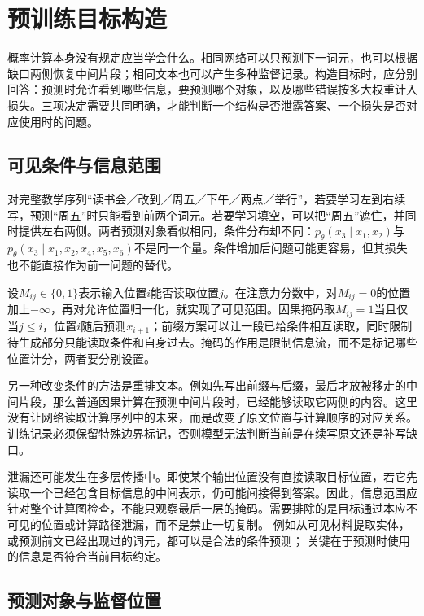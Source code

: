 \section{预训练目标构造}
\label{sec:nlp-llm-objectives}

概率计算本身没有规定应当学会什么。相同网络可以只预测下一词元，也可以根据缺口两侧恢复中间片段；相同文本也可以产生多种监督记录。构造目标时，应分别回答：预测时允许看到哪些信息，要预测哪个对象，以及哪些错误按多大权重计入损失。三项决定需要共同明确，才能判断一个结构是否泄露答案、一个损失是否对应使用时的问题。

\subsection{可见条件与信息范围}
\label{sec:nlp-llm-objective-visibility}

对完整教学序列“读书会／改到／周五／下午／两点／举行”，若要学习左到右续写，预测“周五”时只能看到前两个词元。若要学习填空，可以把“周五”遮住，并同时提供左右两侧。两者预测对象看似相同，条件分布却不同：$p_\theta(x_3\mid x_1,x_2)$与$p_\theta(x_3\mid x_1,x_2,x_4,x_5,x_6)$不是同一个量。条件增加后问题可能更容易，但其损失也不能直接作为前一问题的替代。

设$M_{ij}\in\{0,1\}$表示输入位置$i$能否读取位置$j$。在注意力分数中，对$M_{ij}=0$的位置加上$-\infty$，再对允许位置归一化，就实现了可见范围。因果掩码取$M_{ij}=1$当且仅当$j\leq i$，位置$i$随后预测$x_{i+1}$；前缀方案可以让一段已给条件相互读取，同时限制待生成部分只能读取条件和自身过去。掩码的作用是限制信息流，而不是标记哪些位置计分，两者要分别设置。

另一种改变条件的方法是重排文本。例如先写出前缀与后缀，最后才放被移走的中间片段，那么普通因果计算在预测中间片段时，已经能够读取它两侧的内容。这里没有让网络读取计算序列中的未来，而是改变了原文位置与计算顺序的对应关系。训练记录必须保留特殊边界标记，否则模型无法判断当前是在续写原文还是补写缺口。

泄漏还可能发生在多层传播中。即使某个输出位置没有直接读取目标位置，若它先读取一个已经包含目标信息的中间表示，仍可能间接得到答案。因此，信息范围应针对整个计算图检查，不能只观察最后一层的掩码。需要排除的是目标通过本应不可见的位置或计算路径泄漏，而不是禁止一切复制。
例如从可见材料提取实体，或预测前文已经出现过的词元，都可以是合法的条件预测；
关键在于预测时使用的信息是否符合当前目标约定。

\subsection{预测对象与监督位置}
\label{sec:nlp-llm-objective-positions}

